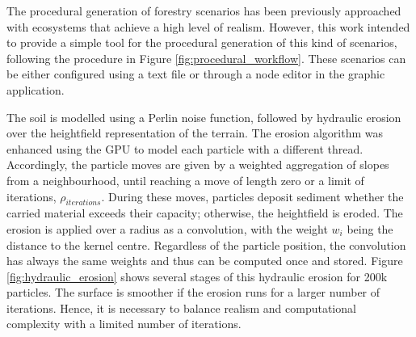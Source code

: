 The procedural generation of forestry scenarios has been previously approached with ecosystems \cite{cordonnier_authoring_2017, fischer_autobiomes_2020, makowski_synthetic_2019} that achieve a high level of realism. However, this work intended to provide a simple tool for the procedural generation of this kind of scenarios, following the procedure in Figure \ref{fig:procedural_workflow}. These scenarios can be either configured using a text file or through a node editor in the graphic application.

The soil is modelled using a Perlin noise function, followed by hydraulic erosion over the heightfield representation of the terrain. The erosion algorithm was enhanced using the GPU to model each particle with a different thread. Accordingly, the particle moves are given by a weighted aggregation of slopes from a neighbourhood, until reaching a move of length zero or a limit of iterations, $\rho_{\textit{iterations}}$. During these moves, particles deposit sediment whether the carried material exceeds their capacity; otherwise, the heightfield is eroded. The erosion is applied over a radius as a convolution, with the weight $w_i$ being the distance to the kernel centre. Regardless of the particle position, the convolution has always the same weights and thus can be computed once and stored. Figure \ref{fig:hydraulic_erosion} shows several stages of this hydraulic erosion for 200k particles. The surface is smoother if the erosion runs for a larger number of iterations. Hence, it is necessary to balance realism and computational complexity with a limited number of iterations. 

